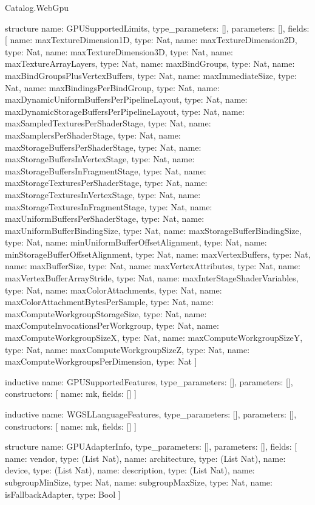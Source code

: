 \begin{lexlean}{Catalog.WebGpu}
\begin{semanticmodule}
structure{
  name: GPUSupportedLimits,
  type_parameters: [],
  parameters: [],
  fields: [
    {name: maxTextureDimension1D, type: Nat},
    {name: maxTextureDimension2D, type: Nat},
    {name: maxTextureDimension3D, type: Nat},
    {name: maxTextureArrayLayers, type: Nat},
    {name: maxBindGroups, type: Nat},
    {name: maxBindGroupsPlusVertexBuffers, type: Nat},
    {name: maxImmediateSize, type: Nat},
    {name: maxBindingsPerBindGroup, type: Nat},
    {name: maxDynamicUniformBuffersPerPipelineLayout, type: Nat},
    {name: maxDynamicStorageBuffersPerPipelineLayout, type: Nat},
    {name: maxSampledTexturesPerShaderStage, type: Nat},
    {name: maxSamplersPerShaderStage, type: Nat},
    {name: maxStorageBuffersPerShaderStage, type: Nat},
    {name: maxStorageBuffersInVertexStage, type: Nat},
    {name: maxStorageBuffersInFragmentStage, type: Nat},
    {name: maxStorageTexturesPerShaderStage, type: Nat},
    {name: maxStorageTexturesInVertexStage, type: Nat},
    {name: maxStorageTexturesInFragmentStage, type: Nat},
    {name: maxUniformBuffersPerShaderStage, type: Nat},
    {name: maxUniformBufferBindingSize, type: Nat},
    {name: maxStorageBufferBindingSize, type: Nat},
    {name: minUniformBufferOffsetAlignment, type: Nat},
    {name: minStorageBufferOffsetAlignment, type: Nat},
    {name: maxVertexBuffers, type: Nat},
    {name: maxBufferSize, type: Nat},
    {name: maxVertexAttributes, type: Nat},
    {name: maxVertexBufferArrayStride, type: Nat},
    {name: maxInterStageShaderVariables, type: Nat},
    {name: maxColorAttachments, type: Nat},
    {name: maxColorAttachmentBytesPerSample, type: Nat},
    {name: maxComputeWorkgroupStorageSize, type: Nat},
    {name: maxComputeInvocationsPerWorkgroup, type: Nat},
    {name: maxComputeWorkgroupSizeX, type: Nat},
    {name: maxComputeWorkgroupSizeY, type: Nat},
    {name: maxComputeWorkgroupSizeZ, type: Nat},
    {name: maxComputeWorkgroupsPerDimension, type: Nat}
  ]
}

inductive{
  name: GPUSupportedFeatures,
  type_parameters: [],
  parameters: [],
  constructors: [
    {name: mk, fields: []}
  ]
}

inductive{
  name: WGSLLanguageFeatures,
  type_parameters: [],
  parameters: [],
  constructors: [
    {name: mk, fields: []}
  ]
}

structure{
  name: GPUAdapterInfo,
  type_parameters: [],
  parameters: [],
  fields: [
    {name: vendor, type: (List Nat)},
    {name: architecture, type: (List Nat)},
    {name: device, type: (List Nat)},
    {name: description, type: (List Nat)},
    {name: subgroupMinSize, type: Nat},
    {name: subgroupMaxSize, type: Nat},
    {name: isFallbackAdapter, type: Bool}
  ]
}


\end{semanticmodule}
\end{lexlean}

